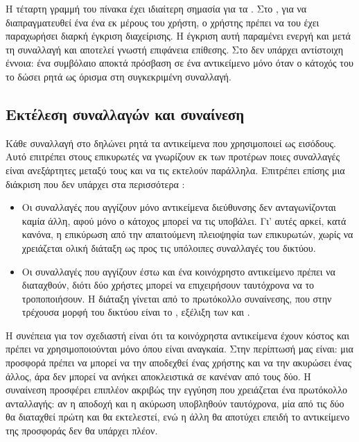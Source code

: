 Η τέταρτη γραμμή του πίνακα έχει ιδιαίτερη σημασία για τα . Στο
, για να διαπραγματευθεί ένα  ένα  εκ μέρους του
χρήστη, ο χρήστης πρέπει να του έχει παραχωρήσει διαρκή έγκριση διαχείρισης. Η έγκριση
αυτή παραμένει ενεργή και μετά τη συναλλαγή και αποτελεί γνωστή επιφάνεια επίθεσης. Στο
 δεν υπάρχει αντίστοιχη έννοια: ένα συμβόλαιο αποκτά πρόσβαση σε ένα αντικείμενο
μόνο όταν ο κάτοχός του το δώσει ρητά ως όρισμα στη συγκεκριμένη συναλλαγή.

\subsection{Εκτέλεση συναλλαγών και συναίνεση}
\label{sec:sui-consensus}

Κάθε συναλλαγή στο  δηλώνει ρητά τα αντικείμενα που χρησιμοποιεί ως εισόδους. Αυτό
επιτρέπει στους επικυρωτές να γνωρίζουν εκ των προτέρων ποιες συναλλαγές είναι ανεξάρτητες
μεταξύ τους και να τις εκτελούν παράλληλα. Επιτρέπει επίσης μια διάκριση που δεν υπάρχει
στα περισσότερα  \cite{suilutris2023}:

\begin{itemize}[nosep]
  \item Οι συναλλαγές που αγγίζουν μόνο αντικείμενα διεύθυνσης δεν ανταγωνίζονται καμία
        άλλη, αφού μόνο ο κάτοχος μπορεί να τις υποβάλει. Γι' αυτές αρκεί, κατά κανόνα, η
        επικύρωση από την απαιτούμενη πλειοψηφία των επικυρωτών, χωρίς να χρειάζεται ολική
        διάταξη ως προς τις υπόλοιπες συναλλαγές του δικτύου.
  \item Οι συναλλαγές που αγγίζουν έστω και ένα κοινόχρηστο αντικείμενο πρέπει να
        διαταχθούν, διότι δύο χρήστες μπορεί να επιχειρήσουν ταυτόχρονα να το
        τροποποιήσουν. Η διάταξη γίνεται από το πρωτόκολλο συναίνεσης, που στην τρέχουσα
        μορφή του δικτύου είναι το  \cite{mysticeti2023}, εξέλιξη των
         και  \cite{narwhal2022}.
\end{itemize}

Η συνέπεια για τον σχεδιαστή είναι ότι τα κοινόχρηστα αντικείμενα έχουν κόστος και πρέπει
να χρησιμοποιούνται μόνο όπου είναι αναγκαία. Στην περίπτωσή μας είναι: μια προσφορά
πρέπει να μπορεί να την αποδεχθεί ένας χρήστης και να την ακυρώσει ένας άλλος, άρα δεν
μπορεί να ανήκει αποκλειστικά σε κανέναν από τους δύο. Η συναίνεση προσφέρει επιπλέον
ακριβώς την εγγύηση που χρειάζεται ένα πρωτόκολλο ανταλλαγής: αν η αποδοχή και η ακύρωση
υποβληθούν ταυτόχρονα, μία από τις δύο θα διαταχθεί πρώτη και θα εκτελεστεί, ενώ η άλλη θα
αποτύχει επειδή το αντικείμενο της προσφοράς δεν θα υπάρχει πλέον.

